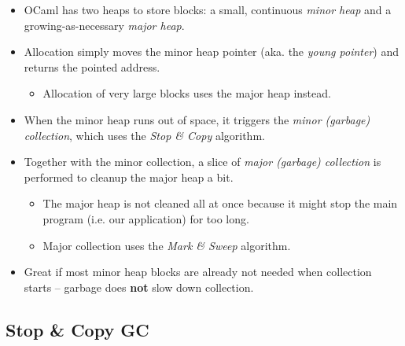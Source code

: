 \documentclass{beamer}
\newcommand{\tmem}[1]{{\em #1\/}}
\newcommand{\tmstrong}[1]{\textbf{#1}}
\begin{document}
\begin{itemize}
  \item OCaml has two heaps to store blocks: a small, continuous {\tmem{minor
  heap}} and a growing-as-necessary {\tmem{major heap}}.
  
  \item Allocation simply moves the minor heap pointer (aka. the {\tmem{young
  pointer}}) and returns the pointed address.
  \begin{itemize}
    \item Allocation of very large blocks uses the major heap instead.
  \end{itemize}
  \item When the minor heap runs out of space, it triggers the {\tmem{minor
  (garbage) collection}}, which uses the {\tmem{Stop \& Copy}} algorithm.
  
  \item Together with the minor collection, a slice of {\tmem{major (garbage)
  collection}} is performed to cleanup the major heap a bit.
  \begin{itemize}
    \item The major heap is not cleaned all at once because it might stop the
    main program (i.e. our application) for too long.
    
    \item Major collection uses the {\tmem{Mark \& Sweep}} algorithm.
  \end{itemize}
  \item Great if most minor heap blocks are already not needed when collection
  starts -- garbage does {\tmstrong{not}} slow down collection.
\end{itemize}

\subsection{Stop \& Copy GC}
\end{document}
